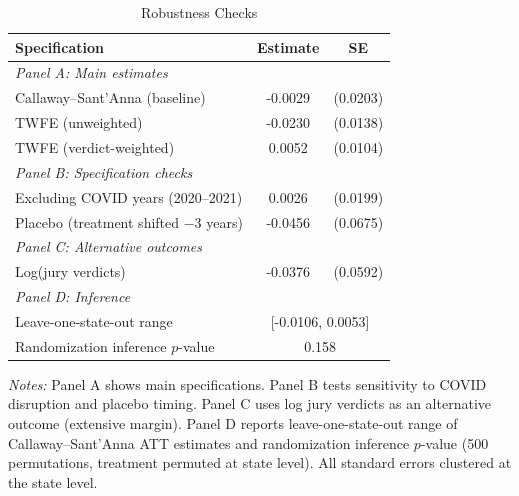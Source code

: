 \begin{table}[htbp]
\centering
\caption{Robustness Checks}
\label{tab:robustness}
\begin{tabular}{lcc}
\hline\hline
Specification & Estimate & SE \\
\hline
\multicolumn{3}{l}{\textit{Panel A: Main estimates}} \\
Callaway--Sant'Anna (baseline) & -0.0029 & (0.0203) \\
TWFE (unweighted) & -0.0230 & (0.0138) \\
TWFE (verdict-weighted) & 0.0052 & (0.0104) \\
\hline
\multicolumn{3}{l}{\textit{Panel B: Specification checks}} \\
Excluding COVID years (2020--2021) & 0.0026 & (0.0199) \\
Placebo (treatment shifted $-3$ years) & -0.0456 & (0.0675) \\
\hline
\multicolumn{3}{l}{\textit{Panel C: Alternative outcomes}} \\
Log(jury verdicts) & -0.0376 & (0.0592) \\
\hline
\multicolumn{3}{l}{\textit{Panel D: Inference}} \\
Leave-one-state-out range & \multicolumn{2}{c}{[-0.0106, 0.0053]} \\
Randomization inference $p$-value & \multicolumn{2}{c}{0.158} \\
\hline\hline
\end{tabular}
\begin{tablenotes}
\item \textit{Notes:} Panel A shows main specifications. Panel B tests sensitivity to COVID disruption and placebo timing. Panel C uses log jury verdicts as an alternative outcome (extensive margin). Panel D reports leave-one-state-out range of Callaway--Sant'Anna ATT estimates and randomization inference $p$-value (500 permutations, treatment permuted at state level). All standard errors clustered at the state level.
\end{tablenotes}
\end{table}

